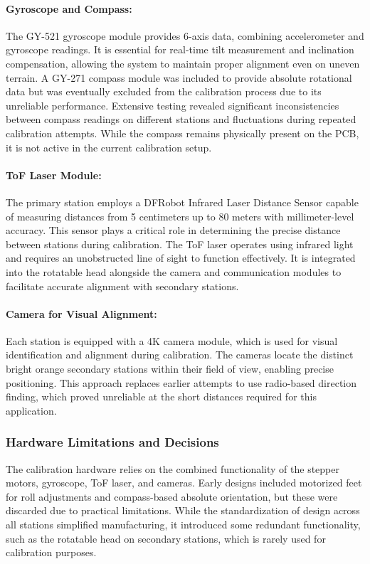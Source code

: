 \paragraph{Gyroscope and Compass:}
The GY-521 gyroscope module provides 6-axis data, combining accelerometer and gyroscope readings. It is essential for real-time tilt measurement and inclination compensation, allowing the system to maintain proper alignment even on uneven terrain. A GY-271 compass module was included to provide absolute rotational data but was eventually excluded from the calibration process due to its unreliable performance. Extensive testing revealed significant inconsistencies between compass readings on different stations and fluctuations during repeated calibration attempts. While the compass remains physically present on the PCB, it is not active in the current calibration setup.

\paragraph{ToF Laser Module:}
The primary station employs a DFRobot Infrared Laser Distance Sensor capable of measuring distances from 5 centimeters up to 80 meters with millimeter-level accuracy. This sensor plays a critical role in determining the precise distance between stations during calibration. The ToF laser operates using infrared light and requires an unobstructed line of sight to function effectively. It is integrated into the rotatable head alongside the camera and communication modules to facilitate accurate alignment with secondary stations.

\paragraph{Camera for Visual Alignment:}
Each station is equipped with a 4K camera module, which is used for visual identification and alignment during calibration. The cameras locate the distinct bright orange secondary stations within their field of view, enabling precise positioning. This approach replaces earlier attempts to use radio-based direction finding, which proved unreliable at the short distances required for this application.

\subsubsection*{Hardware Limitations and Decisions}
The calibration hardware relies on the combined functionality of the stepper motors, gyroscope, ToF laser, and cameras. Early designs included motorized feet for roll adjustments and compass-based absolute orientation, but these were discarded due to practical limitations. While the standardization of design across all stations simplified manufacturing, it introduced some redundant functionality, such as the rotatable head on secondary stations, which is rarely used for calibration purposes.

